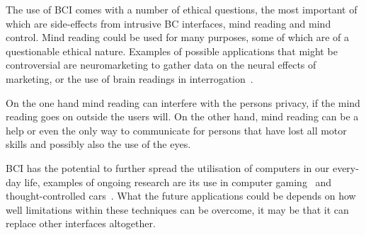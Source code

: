 The use of BCI comes with a number of ethical questions, the most important of which are side-effects from intrusive BC interfaces, mind reading and mind control. Mind reading could be used for many purposes, some of which are of a questionable ethical nature. Examples of possible applications that might be controversial are neuromarketing to gather data on the neural effects of marketing, or the use of brain readings in interrogation~\cite{10.1371/journal.pbio.1001289, CB:CB252}.

On the one hand mind reading can interfere with the persons privacy, if the mind reading goes on outside the users will. On the other hand, mind reading can be a help or even the only way to communicate for persons that have lost all motor skills and possibly also the use of the eyes.

BCI has the potential to further spread the utilisation of computers in our every-day life, examples of ongoing research are its use in computer gaming~\cite{gurkok2012brain} and thought-controlled cars~\cite{gohring2013semi}. What the future applications could be depends on how well limitations within these techniques can be overcome, it may be that it can replace other interfaces altogether.

